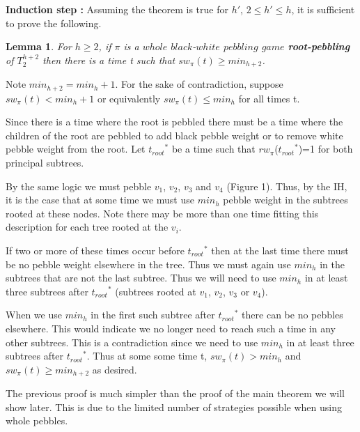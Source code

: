 \documentclass[12pt]{article}
\newenvironment{proof}{\noindent {\bf Proof:} \hspace{.4em}}
                      {\hspace{\fill}{$\blacksquare$} \smallskip}
\newtheorem{lemma}[theorem]{Lemma}
\newcommand{\troots}{{t_{root}}^*}
\begin{document}
\noindent
{\bf Induction step :}  Assuming the theorem is true for  $h'$,
$2 \le h' \le h$, it is sufficient to prove the following.

\begin{lemma} \label{bwlb3}
For $h\geq2$, if $\pi$ is a $whole$ $black$-$white$ $pebbling$ $game$ {\bf root-pebbling} of $T_2^{h+2}$ then there is a time t such that $sw_\pi(t) \geq min_{h+2}$.
\end{lemma}


\begin{proof} 

Note $min_{h+2} = min_h + 1$. For the sake of contradiction, suppose $sw_\pi(t) < min_{h} + 1$ or equivalently $sw_\pi(t) \leq min_{h}$ for all times t.
 
Since there is a time where the root is pebbled there must be a time where the children of the root are pebbled to add black pebble weight or to remove white pebble weight from the root. Let $\troots$ be a time such that $rw_\pi$($\troots$)=1 for both principal subtrees.
 
By the same logic we must pebble $v_1$, $v_2$, $v_3$ and $v_4$ (Figure 1). Thus, by the IH, it is the case that at some time we must use $min_h$ pebble weight in the subtrees rooted at these nodes. Note there may be more than one time fitting this description for each tree rooted at the $v_i$.

If two or more of these times occur before $\troots$ then at the last time there must be no pebble weight elsewhere in the tree. Thus we must again use $min_h$ in the subtrees that are not the last subtree.  Thus we will need to use $min_h$ in at least three subtrees after $\troots$ (subtrees rooted at $v_1$, $v_2$, $v_3$ or $v_4$).

When we use $min_h$ in the first such subtree after $\troots$ there can be no pebbles elsewhere. This would indicate we no longer need to reach such a time in any other subtrees. This is a contradiction since we need to use $min_h$ in at least three subtrees after $\troots$. Thus at some some time t, $sw_\pi(t) > min_{h}$ and $sw_\pi(t) \geq min_{h+2}$ as desired.\\
 \end{proof} 
 
 The previous proof is much simpler than the proof of the main theorem we will show later. This is due to the limited number of strategies possible when using whole pebbles.
\end{document}
